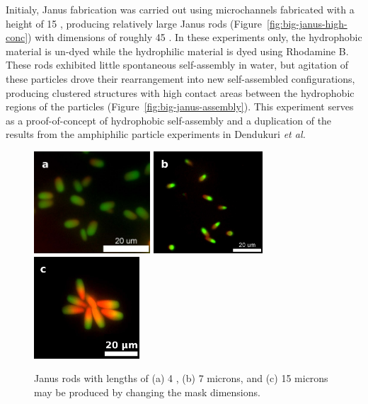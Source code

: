 Initialy, Janus fabrication was carried out using microchannels fabricated with a height of 15 \microns, 
producing relatively large Janus rods (Figure~\ref{fig:big-janus-high-conc}) with dimensions 
of roughly 45   \microns.  In these experiments only, the hydrophobic material is 
un-dyed while the hydrophilic material is dyed using Rhodamine B. These rods 
exhibited little spontaneous self-assembly in water, but agitation
of these particles drove their rearrangement into new 
self-assembled configurations, producing clustered structures with high contact
areas between the hydrophobic regions of the particles (Figure~\ref{fig:big-janus-assembly}).  
This experiment serves as a proof-of-concept of 
hydrophobic self-assembly and a duplication of the
results from the amphiphilic particle experiments in Dendukuri \textit{et al.}~\cite{dendukuri-amph}  

\begin{figure}
\begin{center}
\includegraphics[height=1.5in]{figures/rods/janus-rods-4x2um.png}
\includegraphics[height=1.5in]{figures/rods/janus-rods-6x2um.png}
\includegraphics[height=1.5in]{figures/rods/janus-rod-cluster-zoom.png}
\end{center}
\caption{Janus rods with lengths of (a) 4 \microns, (b) 7 microns, and 
(c) 15 microns may be produced by changing the mask dimensions.}
\label{fig:janus-sizes}
\end{figure}

